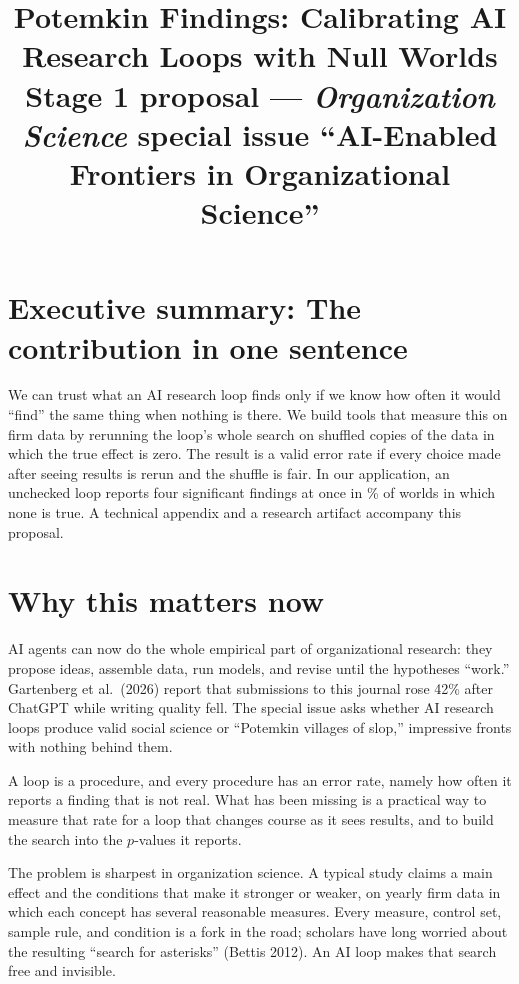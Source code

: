\documentclass[11pt]{article}
\title{\textbf{Potemkin Findings: Calibrating AI Research Loops with Null Worlds}\\[3pt]
\large Stage 1 proposal --- \textit{Organization Science} special issue ``AI-Enabled Frontiers in Organizational Science''}
\date{}
\begin{document}
\maketitle
\vspace{-2em}

\section*{Executive summary: The contribution in one sentence}
We can trust what an AI research loop finds only if we know how often it would ``find'' the same thing when nothing is
there. We build tools that measure this on firm data by rerunning the loop's whole search
on shuffled copies of the data in which the true effect is zero. The result is a valid error rate if every choice made after seeing results is rerun and the shuffle is fair. In our application, an
unchecked loop reports four significant findings at once in \PotemU\% of worlds in which none is true. A technical appendix and a research artifact accompany this proposal.

\section*{Why this matters now}
AI agents can now do the whole empirical part of organizational research: they propose ideas, assemble data, run models,
and revise until the hypotheses ``work.'' Gartenberg et al.\ (2026) report that submissions to this journal rose 42\%
after ChatGPT while writing quality fell. The special issue asks
whether AI research loops produce valid social science or ``Potemkin villages of slop,'' impressive fronts with nothing
behind them.

A loop is a procedure, and every procedure has an error rate, namely how often it reports a
finding that is not real. What has been missing is a practical way to measure that rate for a loop that changes course as it sees
results, and to build the search into the $p$-values it reports.

The problem is sharpest in organization science. A typical study claims a main effect and the conditions that make it
stronger or weaker, on yearly firm data in which each concept has several reasonable measures. Every measure, control
set, sample rule, and condition is a fork in the road; scholars have long worried about the resulting ``search for
asterisks'' (Bettis 2012). An AI loop makes that search
free and invisible.
\end{document}

